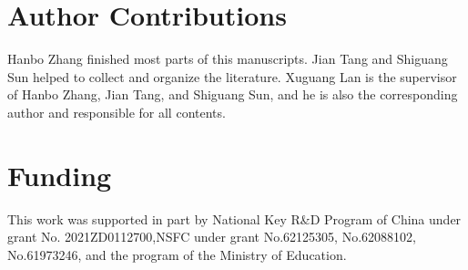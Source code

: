 \documentclass[letterpaper,10pt]{article}
\begin{document}
\section*{Author Contributions}

Hanbo Zhang finished most parts of this manuscripts. Jian Tang and Shiguang Sun helped to collect and organize the literature. Xuguang Lan is the supervisor of Hanbo Zhang, Jian Tang, and Shiguang Sun, and he is also the corresponding author and responsible for all contents.

\section*{Funding}
This work was supported in part by National Key R\&D Program of China under grant No. 2021ZD0112700,NSFC under grant No.62125305, No.62088102, No.61973246, and the program of the Ministry of Education.



\end{document}
